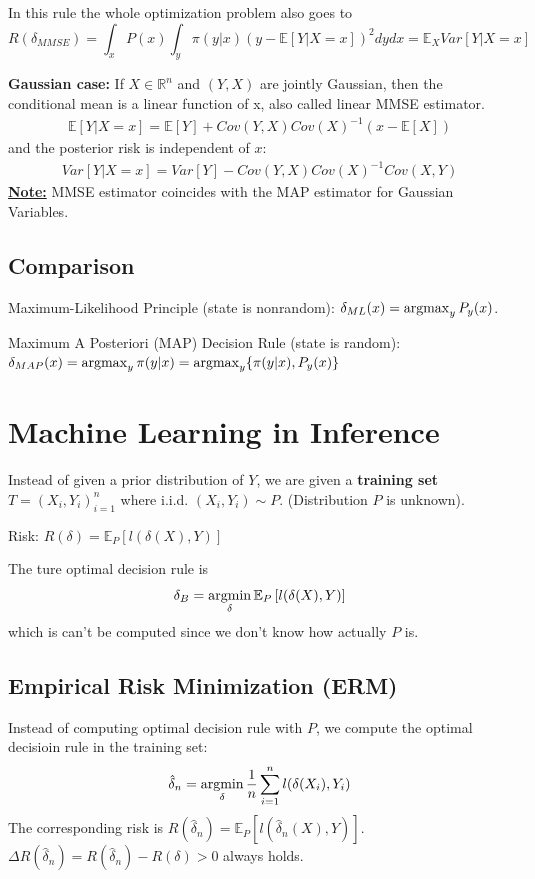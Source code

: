 \documentclass[11pt]{elegantbook}
\newcommand{\argmax}{\operatornamewithlimits{argmax}}
\newcommand{\argmin}{\operatornamewithlimits{argmin}}
\begin{document}
In this rule the whole optimization problem also goes to
$$R(\delta_{MMSE})=\int_x P(x)\int_y \pi(y|x) (y-\mathbb{E}\left[Y|X=x\right])^2 dy dx=\mathbb{E}_X Var\left[Y|X=x\right]$$

\textbf{Gaussian case:}
If $X\in \mathbb{R}^n$ and $(Y,X)$ are jointly Gaussian, then the conditional mean is a linear function of x, also called linear MMSE estimator.
\begin{equation}
    \begin{aligned}
        \mathbb{E}\left[Y|X=x\right]=\mathbb{E}[Y]+Cov(Y,X)Cov(X)^{-1}(x-\mathbb{E}[X])
    \end{aligned}
    \nonumber
\end{equation}
and the posterior risk is independent of $x$:
\begin{equation}
    \begin{aligned}
        Var\left[Y|X=x\right]=Var[Y]-Cov(Y,X)Cov(X)^{-1}Cov(X,Y)
    \end{aligned}
    \nonumber
\end{equation}
\underline{\textbf{Note:}} MMSE estimator coincides with the MAP estimator for Gaussian Variables.

\section{Comparison}
Maximum-Likelihood Principle (state is nonrandom): $\delta_{ML}(x)=\argmax_y P_y(x)$.

Maximum A Posteriori (MAP) Decision Rule (state is random): $\delta_{MAP}(x)=\argmax_y \pi(y|x)=\argmax_y \{\pi(y|x),P_y(x)\}$


\chapter{Machine Learning in Inference}
Instead of given a prior distribution of $Y$, we are given a \textbf{training set} $T=(X_i,Y_i)_{i=1}^n$ where i.i.d. $(X_i,Y_i)\sim P$. (Distribution $P$ is unknown).

Risk: $R(\delta)=\mathbb{E}_P\left[l(\delta(X),Y)\right]$

The ture optimal decision rule is $$\delta_B=\argmin_\delta \mathbb{E}_P\left[l(\delta(X),Y)\right]$$
which is can't be computed since we don't know how actually $P$ is.

\section{Empirical Risk Minimization (ERM)}
Instead of computing optimal decision rule with $P$, we compute the optimal decisioin rule in the training set:
$$\hat{\delta}_n=\argmin_\delta \frac{1}{n}\sum_{i=1}^nl(\delta(X_i),Y_i)$$
The corresponding risk is $R(\hat{\delta}_n)=\mathbb{E}_P\left[l(\hat{\delta}_n(X),Y)\right]$. $\Delta R(\hat{\delta}_n)=R(\hat{\delta}_n)- R(\delta)>0$ always holds.
\end{document}
